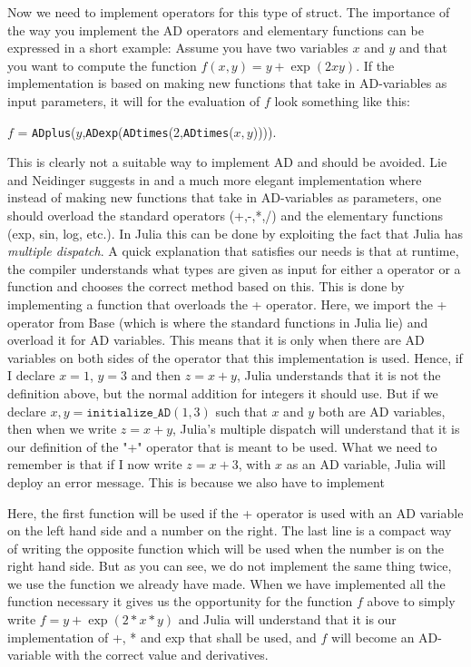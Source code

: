 Now we need to implement operators for this type of struct. The importance of the way you implement the AD operators and elementary functions can be expressed in a short example: Assume you have two variables $x$ and $y$ and that you want to compute the function $f(x,y) = y+\exp(2xy)$. If the implementation is based on making new functions that take in AD-variables as input parameters, it will for the evaluation of $f$ look something like this: 
\begin{center}
    $f$ = \texttt{ADplus}($y$,\texttt{ADexp}(\texttt{ADtimes}(2,\texttt{ADtimes}($x,y$)))).
\end{center}
This is clearly not a suitable way to implement AD and should be avoided. Lie and Neidinger suggests in \emph{\citep{lieMrstUrl}} and \emph{\citep{doi:10.1137/080743627}} a much more elegant implementation where instead of making new functions that take in AD-variables as parameters, one should overload the standard operators (+,-,*,/) and the elementary functions (exp, sin, log, etc.). In Julia this can be done by exploiting the fact that Julia has \emph{multiple dispatch}. A quick explanation that satisfies our needs is that at runtime, the compiler understands what types are given as input for either a operator or a function and chooses the correct method based on this. This is done by implementing a function  
that overloads the + operator. Here, we import the + operator from Base (which is where the standard functions in Julia lie) and overload it for AD variables. This means that it is only when there are AD variables on both sides of the operator that this implementation is used. Hence, if I declare $x = 1$, $y = 3$ and then $z = x+y$, Julia understands that it is not the definition above, but the normal addition for integers it should use. But if we declare $x,y = \texttt{initialize\_AD}(1,3)$ such that $x$ and $y$ both are AD variables, then when we write $z = x+y$, Julia's multiple dispatch will understand that it is our definition of the "+" operator that is meant to be used. What we need to remember is that if I now write $z = x + 3$, with $x$ as an AD variable, Julia will deploy an error message. This is because we also have to implement

Here, the first function will be used if the + operator is used with an AD variable on the left hand side and a number on the right. The last line is a compact way of writing the opposite function which will be used when the number is on the right hand side. But as you can see, we do not implement the same thing twice, we use the function we already have made. When we have implemented all the function necessary it gives us the opportunity for the function $f$ above to simply write $f = y+\exp(2*x*y)$ and Julia will understand that it is our implementation of +, * and exp that shall be used, and $f$ will become an AD-variable with the correct value and derivatives. 

